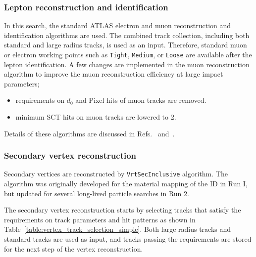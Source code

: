 \subsubsection{Lepton reconstruction and identification}
\label{sec:lepton_reconstruction}

In this search, the standard ATLAS electron and muon reconstruction and identification algorithms are used. The combined track collection, including both standard and large radius tracks, is used as an input. Therefore, standard muon or electron working points such as \texttt{Tight}, \texttt{Medium}, or \texttt{Loose} are available after the lepton identification. A few changes are implemented in the muon reconstruction algorithm to improve the muon reconstruction efficiency at large impact parameters;

\begin{itemize}
	\item requirements on $d_{0}$ and Pixel hits of muon tracks are removed.
	\item minimum SCT hits on muon tracks are lowered to 2.
\end{itemize}

Details of these algorithms are discussed in Refs.~\cite{ATLAS-CONF-2010-005} and~\cite{Aad:2016jkr}.

\subsubsection{Secondary vertex reconstruction}
\label{sec:secondary_vertex_reconstruction}

Secondary vertices are reconstructed by \texttt{VrtSecInclusive} algorithm. The algorithm was originally developed for the material mapping of the ID in Run I, but updated for several long-lived particle searches in Run 2.

The secondary vertex reconstruction starts by selecting tracks that satisfy the requirements on track parameters and hit patterns as shown in Table~\ref{table:vertex_track_selection_simple}. Both large radius tracks and standard tracks are used as input, and tracks passing the requirements are stored for the next step of the vertex reconstruction.

